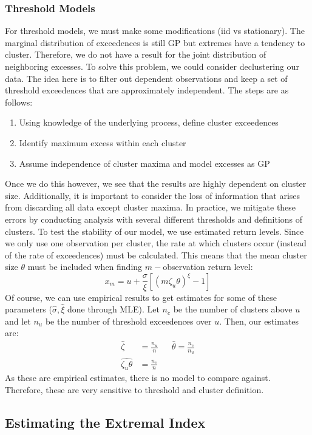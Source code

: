 \documentclass{article}
\theoremstyle{definition}
\theoremstyle{definition}
\begin{document}
\subsubsection{Threshold Models}
For threshold models, we must make some modifications (iid vs stationary). The marginal distribution of exceedences is still GP but extremes have a tendency to cluster. Therefore, we do not have a result for the joint distribution of neighboring excesses. To solve this problem, we could consider declustering our data. The idea here is to filter out dependent observations and keep a set of threshold exceedences that are approximately independent. The steps are as follows:
\begin{enumerate}
    \item Using knowledge of the underlying process, define cluster exceedences
    \item Identify maximum excess within each cluster
    \item Assume independence of cluster maxima and model
excesses as GP
\end{enumerate}
Once we do this however, we see that the results are highly dependent on cluster size. Additionally, it is important to consider the loss of information that arises from discarding all data except cluster maxima. In practice, we mitigate these errors by conducting analysis with several different thresholds and definitions of clusters. To test the stability of our model, we use estimated return levels. Since we only use one observation per cluster, the rate at which clusters occur (instead of the rate of exceedences) must be calculated. This means that the mean cluster size $\theta$ must be included when finding $m-$observation return level:
\[x_m= u+\frac{\sigma}{\xi}[(m\zeta_u\theta)^\xi-1]\]
Of course, we can use empirical results to get estimates for some of these parameters ($\hat{\sigma}, \hat{\xi}$ done through MLE). Let $n_c$ be the number of clusters above $u$ and let $n_u$ be the number of threshold exceedences over $u$. Then, our estimates are:
\begin{align*}
\hat{\zeta}&= \frac{n_u}{n} && \hat{\theta}= \frac{n_c}{n_u}\\
\widehat{\zeta_u\theta}&=\frac{n_c}{n}
\end{align*}
As these are empirical estimates, there is no model to compare against. Therefore, these are very sensitive to threshold and cluster definition.
\subsection{Estimating the Extremal Index}
\end{document}
